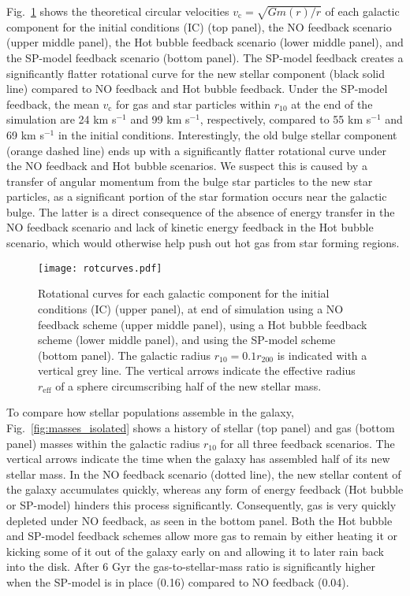 \documentclass[iop]{emulateapj}
\begin{document}
Fig.~\ref{fig:rot_isolated} shows the theoretical circular velocities $v_{\mathrm{c}}=\sqrt{Gm(r)/r}$ of each galactic component for the initial conditions (IC) (top panel), the NO feedback scenario (upper middle panel), the Hot bubble feedback scenario (lower middle panel), and the SP-model feedback scenario (bottom panel). The SP-model feedback creates a significantly flatter rotational curve for the new stellar component (black solid line) compared to NO feedback and Hot bubble feedback. Under the SP-model feedback, the mean $v_{\mathrm{c}}$ for gas and star particles within $r_{10}$  at the end of the simulation are 24 km s$^{-1}$ and 99 km s$^{-1}$, respectively, compared to 55 km s$^{-1}$ and 69 km s$^{-1}$ in the initial conditions. Interestingly, the old bulge stellar component (orange dashed line) ends up with a significantly flatter rotational curve under the NO feedback and Hot bubble scenarios. We suspect this is caused by a transfer of angular momentum from the bulge star particles to the new star particles, as a significant portion of the star formation occurs near the galactic bulge. The latter is a direct consequence of the absence of energy transfer in the NO feedback scenario and lack of kinetic energy feedback in the Hot bubble scenario, which would otherwise help push out hot gas from star forming regions.

\begin{figure}
\texttt{[image: rotcurves.pdf]}
\caption{Rotational curves for each galactic component for the initial conditions (IC) (upper panel), at end of simulation using a NO feedback scheme (upper middle panel), using a Hot bubble feedback scheme (lower middle panel), and using the SP-model scheme (bottom panel). The galactic radius $r_{10}=0.1 r_{200}$ is indicated with a vertical grey line. The vertical arrows indicate the effective radius $r_{\mathrm{eff}}$ of a sphere circumscribing half of the new stellar mass.}
\label{fig:rot_isolated}
\end{figure}

To compare how stellar populations assemble in the galaxy, Fig.~\ref{fig:masses_isolated} shows a history of stellar (top panel) and gas (bottom panel) masses within the galactic radius $r_{10}$ for all three feedback scenarios. The vertical arrows indicate the time when the galaxy has assembled half of its new stellar mass. In the NO feedback scenario (dotted line), the new stellar content of the galaxy accumulates quickly, whereas any form of energy feedback (Hot bubble or SP-model) hinders this process significantly. Consequently, gas is very quickly depleted under NO feedback, as seen in the bottom panel. Both the Hot bubble and SP-model feedback schemes allow more gas to remain by either heating it or kicking some of it out of the galaxy early on and allowing it to later rain back into the disk. After 6 Gyr the gas-to-stellar-mass ratio is significantly higher when the SP-model is in place (0.16) compared to NO feedback (0.04).
\end{document}
